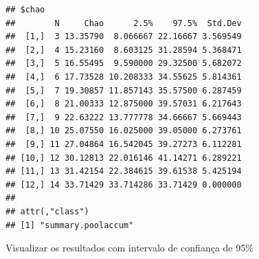 \documentclass[
]{book}
\begin{document}
\begin{verbatim}
## $chao
##        N     Chao      2.5%    97.5%  Std.Dev
##  [1,]  3 13.35790  8.066667 22.16667 3.569549
##  [2,]  4 15.23160  8.603125 31.28594 5.368471
##  [3,]  5 16.55495  9.590000 29.32500 5.682072
##  [4,]  6 17.73528 10.208333 34.55625 5.814361
##  [5,]  7 19.30857 11.857143 35.57500 6.287459
##  [6,]  8 21.00333 12.875000 39.57031 6.217643
##  [7,]  9 22.63222 13.777778 34.66667 5.669443
##  [8,] 10 25.07550 16.025000 39.05000 6.273761
##  [9,] 11 27.04864 16.542045 39.27273 6.112281
## [10,] 12 30.12813 22.016146 41.14271 6.289221
## [11,] 13 31.42154 22.384615 39.61538 5.425194
## [12,] 14 33.71429 33.714286 33.71429 0.000000
## 
## attr(,"class")
## [1] "summary.poolaccum"
\end{verbatim}

Visualizar os resultados com intervalo de confiança de 95\%
\end{document}
